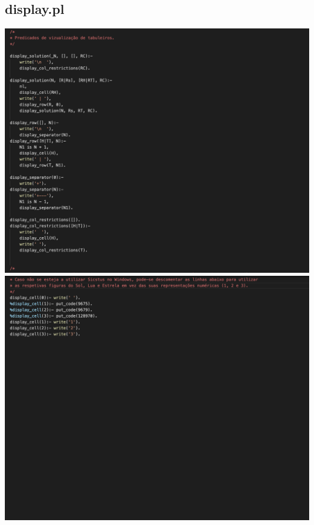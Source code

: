 \documentclass[a4paper]{article}
\begin{document}
\begin{center}
\end{center}

\subsection{display.pl}
\begin{center}
    \includegraphics[scale=0.4]{img/21.png}
    \includegraphics[scale=0.4]{img/22.png}
\end{center}
\end{document}
